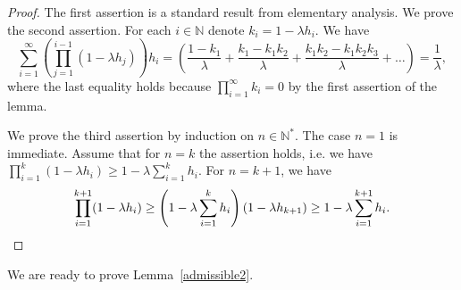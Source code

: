 \documentclass[english,openary,12pt]{article}
\theoremstyle{definition}
\newcommand{\N}{\mathbb{N}}
\begin{document}
\begin{proof}
  The first assertion is a standard result from elementary analysis. 
  We prove the second assertion. For each $i \in \N$ denote 
  $k_i = 1 - \lambda h_i$. We have
  $$\sum\limits_{i = 1}^\infty \left(\prod\limits_{j = 1}^{i-1} 
  (1 - \lambda h_j)\right) h_i = \left(\frac{1 - k_1}{\lambda} + 
  \frac{k_1 - k_1 k_2}{\lambda} + \frac{k_1 k_2 - k_1 k_ 2 k_3}{\lambda} + 
  \ldots\right) = \frac{1}{\lambda},$$
  where the last equality holds because 
  $\prod\nolimits_{i = 1}^\infty k_i = 0$ by the first assertion of the lemma. 
  
  We prove the third assertion by induction on $n \in \N^*$. 
  The case $n=1$ is immediate. 
  Assume that for $n = k$ the assertion holds, i.e. we have 
  $\prod\limits_{i = 1}^k (1 - \lambda h_i) \ge
  1- \lambda \sum\limits_{i=1}^k h_i$.
  For $n = k+1$, we have 
  \[\prod\limits_{i = 1}^{k+1} (1 - \lambda h_i) \ge 
  \left(1- \lambda \sum\limits_{i=1}^k h_i\right) (1 - \lambda h_{k+1}) \ge
  1- \lambda \sum\limits_{i=1}^{k+1} h_i. \qedhere\]
\end{proof}  

We are ready to prove Lemma~\ref{admissible2}.
\end{document}
